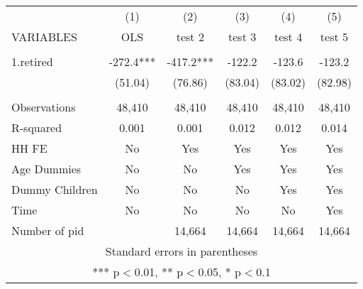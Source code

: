 \begin{tabular}{lccccc} \hline
 & (1) & (2) & (3) & (4) & (5) \\
VARIABLES & OLS & test 2 & test 3 & test 4 & test 5 \\ \hline
 &  &  &  &  &  \\
1.retired & -272.4*** & -417.2*** & -122.2 & -123.6 & -123.2 \\
 & (51.04) & (76.86) & (83.04) & (83.02) & (82.98) \\
 &  &  &  &  &  \\
Observations & 48,410 & 48,410 & 48,410 & 48,410 & 48,410 \\
R-squared & 0.001 & 0.001 & 0.012 & 0.012 & 0.014 \\
HH FE & No & Yes & Yes & Yes & Yes \\
Age Dummies & No & No & Yes & Yes & Yes \\
Dummy Children & No & No & No & Yes & Yes \\
Time & No & No & No & No & Yes \\
 Number of pid &  & 14,664 & 14,664 & 14,664 & 14,664 \\ \hline
\multicolumn{6}{c}{ Standard errors in parentheses} \\
\multicolumn{6}{c}{ *** p$<$0.01, ** p$<$0.05, * p$<$0.1} \\
\end{tabular}

